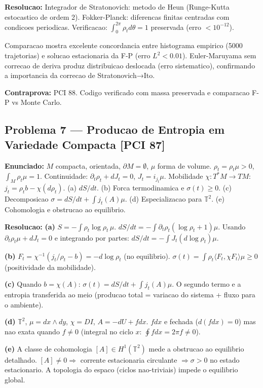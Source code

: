 \documentclass[12pt,a4paper,oneside]{article}
\begin{document}
\textbf{Resolucao:}
Integrador de Stratonovich: metodo de Heun (Runge-Kutta estocastico de ordem 2).
Fokker-Planck: diferencas finitas centradas com condicoes periodicas. Verificacao: $\int_0^{2\pi}\rho_t d\theta=1$ preservada (erro $<10^{-12}$).

Comparacao mostra excelente concordancia entre histograma empirico (5000 trajetorias) e solucao estacionaria da F-P (erro $L^2<0.01$). Euler-Maruyama sem correcao de deriva produz distribuicao deslocada (erro sistematico), confirmando a importancia da correcao de Stratonovich→Ito.

\textbf{Contraprova:} PCI 88. Codigo verificado com massa preservada e comparacao F-P vs Monte Carlo.

\subsection{Problema 7 — Producao de Entropia em Variedade Compacta [PCI 87]}
\textbf{Enunciado:} $M$ compacta, orientada, $\partial M=\emptyset$, $\mu$ forma de volume.
$\rho_t=\rho_t\mu>0$, $\int_M\rho_t\mu=1$. Continuidade: $\partial_t\rho_t+dJ_t=0$, $J_t=i_{j_t}\mu$.
Mobilidade $\chi:T^*M\to TM$: $j_t=\rho_t b-\chi(d\rho_t)$.
(a) $dS/dt$. (b) Forca termodinamica e $\sigma(t)\geq0$.
(c) Decomposicao $\sigma=dS/dt+\int j_t(A)\mu$. (d) Especializacao para $\mathbb{T}^2$.
(e) Cohomologia e obstrucao ao equilibrio.

\textbf{Resolucao:}
\textbf{(a)} $S=-\int\rho_t\log\rho_t\,\mu$. $dS/dt=-\int\partial_t\rho_t(\log\rho_t+1)\mu$. Usando $\partial_t\rho_t\mu+dJ_t=0$ e integrando por partes: $dS/dt=-\int J_t(d\log\rho_t)\mu$.

\textbf{(b)} $F_t=\chi^{-1}(j_t/\rho_t-b)=-d\log\rho_t$ (no equilibrio). $\sigma(t)=\int\rho_t\langle F_t,\chi F_t\rangle\mu\geq0$ (positividade da mobilidade).

\textbf{(c)} Quando $b=\chi(A)$: $\sigma(t)=dS/dt+\int j_t(A)\mu$. O segundo termo e a entropia transferida ao meio (producao total = variacao do sistema + fluxo para o ambiente).

\textbf{(d)} $\mathbb{T}^2$, $\mu=dx\wedge dy$, $\chi=DI$, $A=-dU+fdx$. $fdx$ e fechada ($d(fdx)=0$) mas nao exata quando $f\neq0$ (integral no ciclo $x$: $\oint fdx=2\pi f\neq0$).

\textbf{(e)} A classe de cohomologia $[A]\in H^1(\mathbb{T}^2)$ mede a obstrucao ao equilibrio detalhado. $[A]\neq0\Rightarrow$ corrente estacionaria circulante $\Rightarrow\sigma>0$ no estado estacionario. A topologia do espaco (ciclos nao-triviais) impede o equilibrio global.
\end{document}
